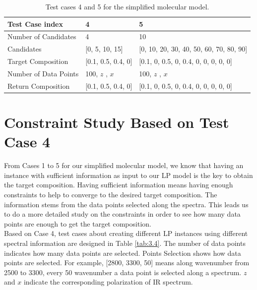 \begin{table} \small 
\begin{center}
{\def\arraystretch{1.5}
\begin{tabular}{| l | p{3cm} | p{6cm} |}
\hline
Test Case index & 4 & 5\\
\hline
Number of Candidates & 4 & 10 \\
\hline
Candidates & [0, 5, 10, 15] & [0, 10, 20, 30, 40, 50, 60, 70, 80, 90] \\
\hline
Target Composition & [0.1, 0.5, 0.4, 0] & [0.1, 0, 0.5, 0, 0.4, 0, 0, 0, 0, 0]\\
\hline
Number of Data Points & 100, $z$ \newline 100, $x$ & 100, $z$ \newline 100, $x$\\
\hline
Return Composition & [0.1, 0.5, 0.4, 0] & [0.1, 0, 0.5, 0, 0.4, 0, 0, 0, 0, 0] \\
\hline
\end{tabular}
} 
\caption{Test cases 4 and 5 for the simplified molecular model.}\label{tab:3.3}
\end{center}
\end{table}		

\section{Constraint Study Based on Test Case 4}

From Cases 1 to 5 for our simplified molecular model, we know that having an instance with sufficient information as input to our LP model is the key to obtain the target composition. Having sufficient information means having enough constraints to help to converge to the desired target composition. The information stems from the data points selected along the spectra. This leads us to do a more detailed study on the constraints in order to see how many data points are enough to get the target composition.\\ 

Based on Case 4, test cases about creating different LP instances using different spectral information are designed in Table \ref{tab:3.4}. The number of data points indicates how many data points are selected. Points Selection shows how data points are selected. For example, [2800, 3300, 50] means along wavenumber from 2500 to 3300, every 50 wavenumber a data point is selected along a spectrum. $z$ and $x$ indicate the corresponding polarization of IR spectrum. \\

